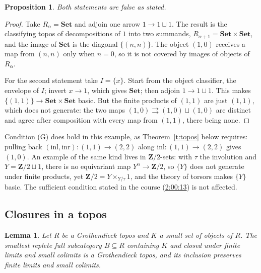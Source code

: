 \documentclass[11pt,a4paper]{amsart}
\newtheorem{proposition}[theorem]{Proposition}
\newtheorem{lemma}[theorem]{Lemma}
\theoremstyle{definition}
\theoremstyle{remark}
\newcommand{\ts}[3]{\href{https://www.youtube.com/watch?v=#1&t=#2}{#3}}
\newcommand{\Set}{\mathbf{Set}}
\begin{document}
\begin{proposition}\label{p:toposfalse}
Both statements are false as stated.
\end{proposition}

\begin{proof}
Take $R_\alpha=\Set$ and adjoin one arrow $1\to1\sqcup1$. The result is the classifying topos of decompositions of $1$ into two summands, $R_{\alpha+1}=\Set\times\Set$, and the image of $\Set$ is the diagonal $\{(n,n)\}$. The object $(1,0)$ receives a map from $(n,n)$ only when $n=0$, so it is not covered by images of objects of $R_\alpha$.

For the second statement take $I=\{x\}$. Start from the object classifier, the envelope of $I$; invert $x\to1$, which gives $\Set$; then adjoin $1\to1\sqcup1$. This makes $\{(1,1)\}\to\Set\times\Set$ basic. But the finite products of $(1,1)$ are just $(1,1)$, which does not generate: the two maps $(1,0)\rightrightarrows(1,0)\sqcup(1,0)$ are distinct and agree after composition with every map from $(1,1)$, there being none.
\end{proof}

Condition (G) does hold in this example, as Theorem~\ref{t:topos} below requires: pulling back $(\mathrm{inl},\mathrm{inr})\colon(1,1)\to(2,2)$ along $\mathrm{inl}\colon(1,1)\to(2,2)$ gives $(1,0)$. An example of the same kind lives in $\mathbf Z/2$-sets: with $\tau$ the involution and $Y=\mathbf Z/2\sqcup1$, there is no equivariant map $Y^n\to\mathbf Z/2$, so $\{Y\}$ does not generate under finite products, yet $\mathbf Z/2=Y\times_{Y/\tau}1$, and the theory of torsors makes $\{Y\}$ basic. The sufficient condition stated in the course (\ts{ORG14LNb5gE}{2h0m13s}{2:00:13}) is not affected.

\subsection{Closures in a topos}

\begin{lemma}\label{l:topos}
Let $R$ be a Grothendieck topos and $K$ a small set of objects of $R$. The smallest replete full subcategory $B\subseteq R$ containing $K$ and closed under finite limits and small colimits is a Grothendieck topos, and its inclusion preserves finite limits and small colimits.
\end{lemma}
\end{document}
